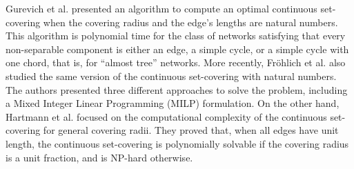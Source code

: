 \documentclass[review]{elsarticle}
\theoremstyle{definition}
\begin{document}
Gurevich et al. \cite{Gurevich84} presented an algorithm to compute an optimal continuous set-covering when the covering radius and the edge's lengths are natural numbers. This algorithm is polynomial time for the class of networks satisfying that every non-separable component is either an edge, a simple cycle, or a simple cycle with one chord, that is, for ``almost tree'' networks. More recently, Fr\"ohlich et al.  \cite{Hamacher20} also studied the same version of the continuous set-covering with natural numbers. The authors presented three different approaches to solve the problem, including a Mixed Integer Linear Programming (MILP) formulation. On the other hand, Hartmann et al. \cite{Hartmann21} focused on the computational complexity of the continuous set-covering for general covering radii. They proved that, when all edges have unit length, the continuous set-covering is polynomially solvable if the covering radius is a unit fraction, and is NP-hard otherwise.
\end{document}
